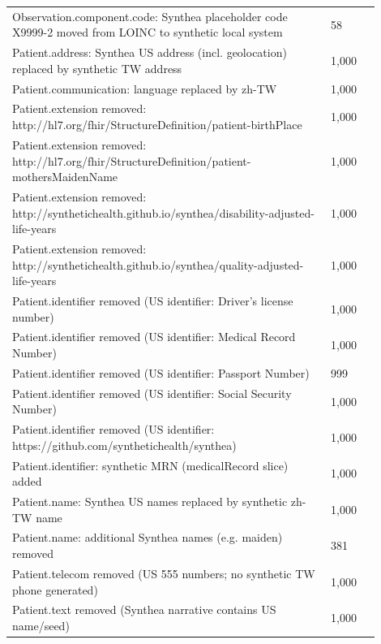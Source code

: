 {\begin{longtable}{p{0.78\linewidth}p{0.12\linewidth}}
Observation.\allowbreak{}component.\allowbreak{}code:\allowbreak{} Synthea placeholder code X9999-\allowbreak{}2 moved from LOINC to synthetic local system & 58 \\
Patient.\allowbreak{}address:\allowbreak{} Synthea US address (incl.\allowbreak{} geolocation) replaced by synthetic TW address & 1,000 \\
Patient.\allowbreak{}communication:\allowbreak{} language replaced by zh-\allowbreak{}TW & 1,000 \\
Patient.\allowbreak{}extension removed:\allowbreak{} http:\allowbreak{}/\allowbreak{}/\allowbreak{}hl7.\allowbreak{}org/\allowbreak{}fhir/\allowbreak{}StructureDefinition/\allowbreak{}patient-\allowbreak{}birthPlace & 1,000 \\
Patient.\allowbreak{}extension removed:\allowbreak{} http:\allowbreak{}/\allowbreak{}/\allowbreak{}hl7.\allowbreak{}org/\allowbreak{}fhir/\allowbreak{}StructureDefinition/\allowbreak{}patient-\allowbreak{}mothersMaidenName & 1,000 \\
Patient.\allowbreak{}extension removed:\allowbreak{} http:\allowbreak{}/\allowbreak{}/\allowbreak{}synthetichealth.\allowbreak{}github.\allowbreak{}io/\allowbreak{}synthea/\allowbreak{}disability-\allowbreak{}adjusted-\allowbreak{}life-\allowbreak{}years & 1,000 \\
Patient.\allowbreak{}extension removed:\allowbreak{} http:\allowbreak{}/\allowbreak{}/\allowbreak{}synthetichealth.\allowbreak{}github.\allowbreak{}io/\allowbreak{}synthea/\allowbreak{}quality-\allowbreak{}adjusted-\allowbreak{}life-\allowbreak{}years & 1,000 \\
Patient.\allowbreak{}identifier removed (US identifier:\allowbreak{} Driver's license number) & 1,000 \\
Patient.\allowbreak{}identifier removed (US identifier:\allowbreak{} Medical Record Number) & 1,000 \\
Patient.\allowbreak{}identifier removed (US identifier:\allowbreak{} Passport Number) & 999 \\
Patient.\allowbreak{}identifier removed (US identifier:\allowbreak{} Social Security Number) & 1,000 \\
Patient.\allowbreak{}identifier removed (US identifier:\allowbreak{} https:\allowbreak{}/\allowbreak{}/\allowbreak{}github.\allowbreak{}com/\allowbreak{}synthetichealth/\allowbreak{}synthea) & 1,000 \\
Patient.\allowbreak{}identifier:\allowbreak{} synthetic MRN (medicalRecord slice) added & 1,000 \\
Patient.\allowbreak{}name:\allowbreak{} Synthea US names replaced by synthetic zh-\allowbreak{}TW name & 1,000 \\
Patient.\allowbreak{}name:\allowbreak{} additional Synthea names (e.\allowbreak{}g.\allowbreak{} maiden) removed & 381 \\
Patient.\allowbreak{}telecom removed (US 555 numbers; no synthetic TW phone generated) & 1,000 \\
Patient.\allowbreak{}text removed (Synthea narrative contains US name/\allowbreak{}seed) & 1,000 \\
\hline\end{longtable}}

